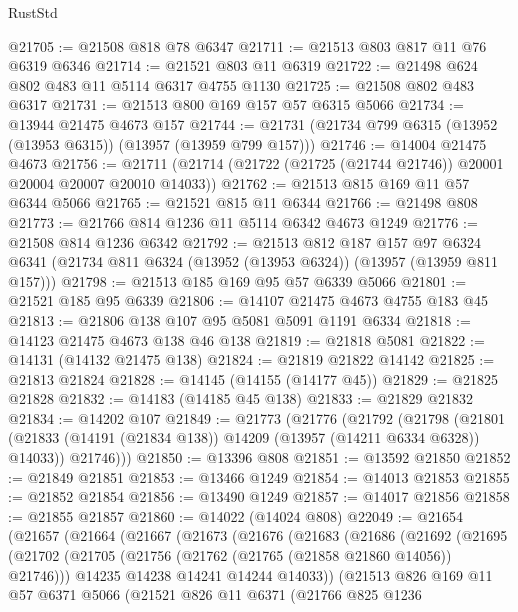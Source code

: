 \begin{lexlean}{RustStd}
\begin{coremodule}
@21705 := @21508 @818 @78 @6347
@21711 := @21513 @803 @817 @11 @76 @6319 @6346
@21714 := @21521 @803 @11 @6319
@21722 := @21498 @624 @802 @483 @11 @5114 @6317 @4755 @1130
@21725 := @21508 @802 @483 @6317
@21731 := @21513 @800 @169 @157 @57 @6315 @5066
@21734 := @13944 @21475 @4673 @157
@21744 := @21731 (@21734 @799 @6315 (@13952 (@13953 @6315)) (@13957 (@13959 @799 @157)))
@21746 := @14004 @21475 @4673
@21756 := @21711 (@21714 (@21722 (@21725 (@21744 @21746)) @20001 @20004 @20007 @20010 @14033))
@21762 := @21513 @815 @169 @11 @57 @6344 @5066
@21765 := @21521 @815 @11 @6344
@21766 := @21498 @808
@21773 := @21766 @814 @1236 @11 @5114 @6342 @4673 @1249
@21776 := @21508 @814 @1236 @6342
@21792 := @21513
    @812
    @187
    @157
    @97
    @6324
    @6341
    (@21734 @811 @6324 (@13952 (@13953 @6324)) (@13957 (@13959 @811 @157)))
@21798 := @21513 @185 @169 @95 @57 @6339 @5066
@21801 := @21521 @185 @95 @6339
@21806 := @14107 @21475 @4673 @4755 @183 @45
@21813 := @21806 @138 @107 @95 @5081 @5091 @1191 @6334
@21818 := @14123 @21475 @4673 @138 @46 @138
@21819 := @21818 @5081
@21822 := @14131 (@14132 @21475 @138)
@21824 := @21819 @21822 @14142
@21825 := @21813 @21824
@21828 := @14145 (@14155 (@14177 @45))
@21829 := @21825 @21828
@21832 := @14183 (@14185 @45 @138)
@21833 := @21829 @21832
@21834 := @14202 @107
@21849 := @21773
    (@21776
      (@21792
        (@21798
          (@21801 (@21833 (@14191 (@21834 @138)) @14209 (@13957 (@14211 @6334 @6328)) @14033))
          @21746)))
@21850 := @13396 @808
@21851 := @13592 @21850
@21852 := @21849 @21851
@21853 := @13466 @1249
@21854 := @14013 @21853
@21855 := @21852 @21854
@21856 := @13490 @1249
@21857 := @14017 @21856
@21858 := @21855 @21857
@21860 := @14022 (@14024 @808)
@22049 := @21654
    (@21657
      (@21664
        (@21667
          (@21673
            (@21676
              (@21683
                (@21686
                  (@21692
                    (@21695
                      (@21702
                        (@21705 (@21756 (@21762 (@21765 (@21858 @21860 @14056)) @21746)))
                        @14235
                        @14238
                        @14241
                        @14244
                        @14033))
                    (@21513
                      @826
                      @169
                      @11
                      @57
                      @6371
                      @5066
                      (@21521
                        @826
                        @11
                        @6371
                        (@21766
                          @825
                          @1236

\end{coremodule}
\end{lexlean}
